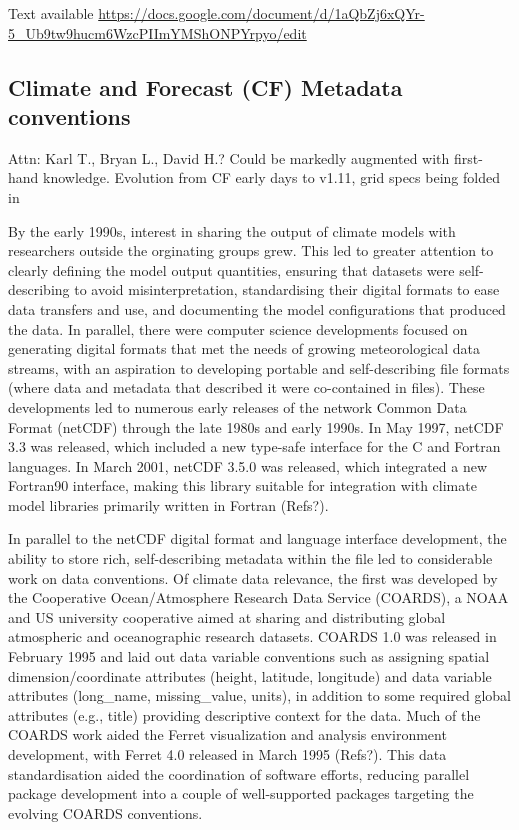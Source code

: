 \documentclass[gmd, preprint]{copernicus}
\newcommand{\mycomment}[1]{}
\def\cred#1{{\color{red}#1}}
\begin{document}
Text available \url{https://docs.google.com/document/d/1aQbZj6xQYr-5_Ub9tw9hucm6WzcPIImYMShONPYrpyo/edit} 


\subsection{Climate and Forecast (CF) Metadata conventions}
\label{sec:CFConventions}
\cred{Attn: Karl T., Bryan L., David H.? Could be markedly augmented with first-hand knowledge. Evolution from CF early days to v1.11, grid specs being folded in}

By the early 1990s, interest in sharing the output of climate models with researchers outside the orginating groups grew. This led to greater attention to clearly defining the model output quantities, ensuring that datasets were self-describing to avoid misinterpretation, standardising their digital formats to ease data transfers and use, and documenting the model configurations that produced the data. In parallel, there were computer science developments focused on generating digital formats that met the needs of growing meteorological data streams, with an aspiration to developing portable and self-describing file formats (where data and metadata that described it were co-contained in files). These developments led to numerous early releases of the network Common Data Format (netCDF) through the late 1980s and early 1990s. In May 1997, netCDF 3.3 was released, which included a new type-safe interface for the C and Fortran languages. In March 2001, netCDF 3.5.0 was released, which integrated a new Fortran90 interface, making this library suitable for integration with climate model libraries primarily written in Fortran \cred{(Refs?)}.
\mycomment{
https://docs.unidata.ucar.edu/nug/2.0-draft/netcdf_history.html
}

In parallel to the netCDF digital format and language interface development, the ability to store rich, self-describing metadata within the file led to considerable work on data conventions. Of climate data relevance, the first was developed by the Cooperative Ocean/Atmosphere Research Data Service (COARDS), a NOAA and US university cooperative aimed at sharing and distributing global atmospheric and oceanographic research datasets. COARDS 1.0 was released in February 1995 and laid out data variable conventions such as assigning spatial dimension/coordinate attributes (height, latitude, longitude) and data variable attributes (long\_name, missing\_value, units), in addition to some required global attributes (e.g., title) providing descriptive context for the data. Much of the COARDS work aided the Ferret visualization and analysis environment development, with Ferret 4.0 released in March 1995 \cred{(Refs?)}. This data standardisation aided the coordination of software efforts, reducing parallel package development into a couple of well-supported packages targeting the evolving COARDS conventions.
\mycomment{
https://ferret.pmel.noaa.gov/Ferret/documentation/coards-netcdf-conventions
https://ferret.pmel.noaa.gov/static/Documentation/Release_Notes/v400.html
Also NCAR CSM - see http://cfconventions.org/conventions.html
}
\end{document}
